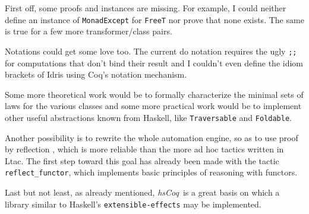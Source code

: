 \documentclass[declaration,inz,english,shortabstract]{iithesis}
\newcommand{\libname}{\textit{hsCoq}}
\newcommand{\m}[1]{\texttt{#1}}
\begin{document}
First off, some proofs and instances are missing. For example, I could neither define an instance of \m{MonadExcept} for \m{FreeT} nor prove that none exists. The same is true for a few more transformer/class pairs.

Notations could get some love too. The current do notation requires the ugly \m{;;} for computations that don't bind their result and I couldn't even define the idiom brackets of Idris using Coq's notation mechanism.

Some more theoretical work would be to formally characterize the minimal sets of laws for the various classes and some more practical work would be to implement other useful abstractions known from Haskell, like \m{Traversable} and \m{Foldable}.

Another possibility is to rewrite the whole automation engine, so as to use proof by reflection \cite{CPDT}, which is more reliable than the more ad hoc tactics written in Ltac. The first step toward this goal has already been made with the tactic \m{reflect\_functor}, which implements basic principles of reasoning with functors.

Last but not least, as already mentioned, \libname\ is a great basis on which a library similar to Haskell's \m{extensible-effects} may be implemented.

\end{document}
